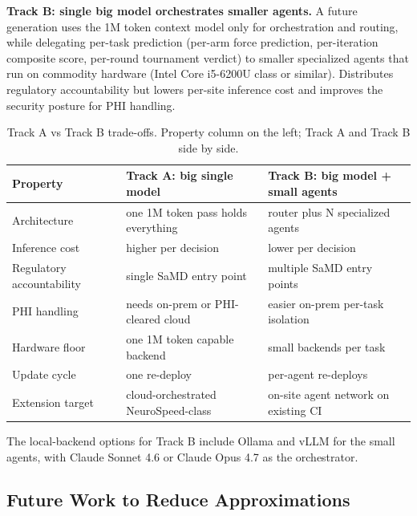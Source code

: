 \textbf{Track B: single big model orchestrates smaller agents.} A
future generation uses the 1M token context model only for
orchestration and routing, while delegating per-task prediction
(per-arm force prediction, per-iteration composite score, per-round
tournament verdict) to smaller specialized agents that run on
commodity hardware (Intel Core i5-6200U class or similar).
Distributes regulatory accountability but lowers per-site inference
cost and improves the security posture for PHI handling.

\begin{table}[H]
\centering
\caption{Track A vs Track B trade-offs. Property column on the left;
Track A and Track B side by side.}
\label{tab:tracks}
\begin{tabular}{>{\raggedright\arraybackslash}p{2.6cm}
                >{\raggedright\arraybackslash}p{6.3cm}
                >{\raggedright\arraybackslash}p{6.3cm}}
\toprule
\textbf{Property} & \textbf{Track A: big single model} & \textbf{Track B: big model + small agents} \\
\midrule
Architecture & one 1M token pass holds everything & router plus N specialized agents \\
Inference cost & higher per decision & lower per decision \\
Regulatory accountability & single SaMD entry point & multiple SaMD entry points \\
PHI handling & needs on-prem or PHI-cleared cloud & easier on-prem per-task isolation \\
Hardware floor & one 1M token capable backend & small backends per task \\
Update cycle & one re-deploy & per-agent re-deploys \\
Extension target & cloud-orchestrated NeuroSpeed-class & on-site agent network on existing CI \\
\bottomrule
\end{tabular}
\end{table}

The local-backend options for Track B include Ollama \cite{ollama}
and vLLM \cite{vllm} for the small agents, with Claude Sonnet 4.6
\cite{claude-sonnet-46} or Claude Opus 4.7 \cite{claude-opus-47} as
the orchestrator.

\subsection{Future Work to Reduce Approximations}
\label{sec:limits-future}

